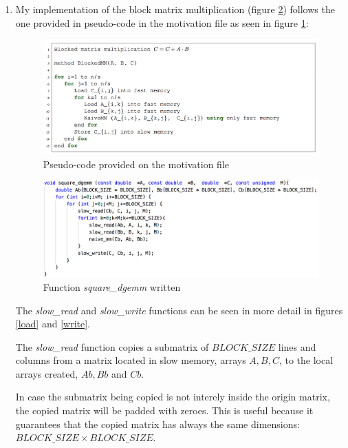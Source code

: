 \documentclass[unicode,11pt,a4paper,oneside,numbers=endperiod,openany]{scrartcl}
\begin{document}
    \begin{enumerate}
        \item My implementation of the block matrix multiplication (figure \ref{code}) follows the one provided in pseudo-code in the motivation file as seen in figure \ref{pseudocode}:
            \begin{figure}[H]
                \includegraphics[width=\linewidth]{pseudocode}
                \caption{Pseudo-code provided on the motivation file}
                \label{pseudocode}
            \end{figure}

            \begin{figure}[H]
                \includegraphics[width=\linewidth]{code}
                \caption{Function \textit{square\_dgemm} written}
                \label{code}
            \end{figure}

            The \textit{slow\_read} and \textit{slow\_write} functions can be seen in more detail in figures \ref{load} and \ref{write}.

            The \textit{slow\_read} function copies a submatrix of $BLOCK\_SIZE$ lines and columns from a matrix located in slow memory, arrays $A, B, C$, to the local arrays created, $Ab, Bb$ and $Cb$.

            In case the submatrix being copied is not interely inside the origin matrix, the copied matrix will be padded with zeroes.
            This is useful because it guarantees that the copied matrix has always the same dimensions: $BLOCK\_SIZE \times BLOCK\_SIZE$.


\end{enumerate}
\end{document}
